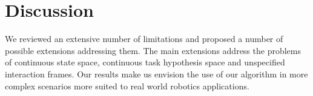 \section{Discussion}
\label{chapter:limitations:discussion}

We reviewed an extensive number of limitations and proposed a number of possible extensions addressing them. The main extensions address the problems of continuous state space, continuous task hypothesis space and unspecified interaction frames. Our results make us envision the use of our algorithm in more complex scenarios more suited to real world robotics applications.

